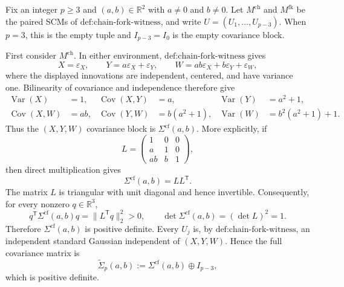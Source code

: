 Fix an integer \(p\ge3\) and \((a,b)\in\mathbb R^2\) with \(a\neq0\) and \(b\neq0\). Let \(M^{\mathrm{ch}}\) and \(M^{\mathrm{fk}}\) be the paired SCMs of \(\text{def:chain-fork-witness}\), and write \(U=(U_1,\ldots,U_{p-3})\). When \(p=3\), this is the empty tuple and \(I_{p-3}=I_0\) is the empty covariance block.

First consider \(M^{\mathrm{ch}}\). In either environment, \(\text{def:chain-fork-witness}\) gives
\[
X=\varepsilon_X,\qquad Y=a\varepsilon_X+\varepsilon_Y,
\qquad W=ab\varepsilon_X+b\varepsilon_Y+\varepsilon_W,
\]
where the displayed innovations are independent, centered, and have variance one. Bilinearity of covariance and independence therefore give
\[
\begin{aligned}
 \operatorname{Var}(X)&=1,
 &\operatorname{Cov}(X,Y)&=a,
 &\operatorname{Var}(Y)&=a^2+1,\\
 \operatorname{Cov}(X,W)&=ab,
 &\operatorname{Cov}(Y,W)&=b(a^2+1),
 &\operatorname{Var}(W)&=b^2(a^2+1)+1.
\end{aligned}
\]
Thus the \((X,Y,W)\) covariance block is \(\Sigma^{\mathrm{cf}}(a,b)\). More explicitly, if
\[
 L=\begin{pmatrix}1&0&0\\a&1&0\\ab&b&1\end{pmatrix},
\]
then direct multiplication gives
\[
 \Sigma^{\mathrm{cf}}(a,b)=LL^{\mathsf T}.
\]
The matrix \(L\) is triangular with unit diagonal and hence invertible. Consequently, for every nonzero \(q\in\mathbb R^3\),
\[
 q^{\mathsf T}\Sigma^{\mathrm{cf}}(a,b)q
 =\lVert L^{\mathsf T}q\rVert_2^2>0,
 \qquad
 \det\Sigma^{\mathrm{cf}}(a,b)=(\det L)^2=1.
\]
Therefore \(\Sigma^{\mathrm{cf}}(a,b)\) is positive definite. Every \(U_j\) is, by \(\text{def:chain-fork-witness}\), an independent standard Gaussian independent of \((X,Y,W)\). Hence the full covariance matrix is
\[
 \widetilde\Sigma_p(a,b)
 :=\Sigma^{\mathrm{cf}}(a,b)\oplus I_{p-3},
\]
which is positive definite.

